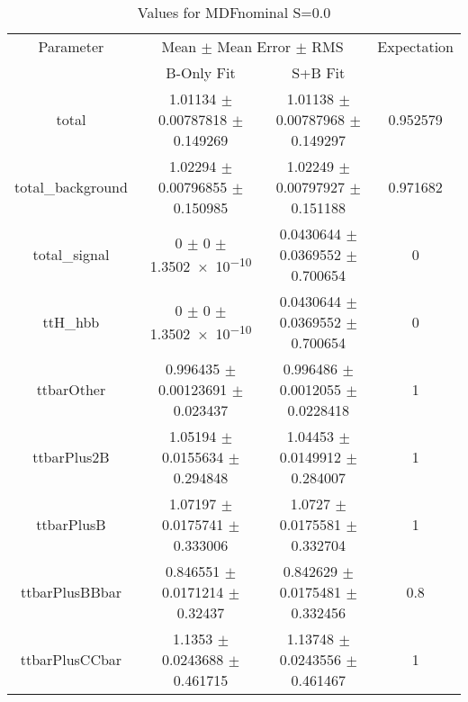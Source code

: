 \begin{table}
\centering
\caption{Values for MDFnominal S=0.0}
\begin{tabular}{cccc}
\toprule
Parameter & \multicolumn{2}{c}{Mean $\pm$ Mean Error $\pm$ RMS} & Expectation\\
 & B-Only Fit & S+B Fit & \\
\midrule
total & \num{1.01134} $\pm$ \num{0.00787818} $\pm$ \num{0.149269} & \num{1.01138} $\pm$ \num{0.00787968} $\pm$ \num{0.149297} & \num{0.952579}\\
total\_background & \num{1.02294} $\pm$ \num{0.00796855} $\pm$ \num{0.150985} & \num{1.02249} $\pm$ \num{0.00797927} $\pm$ \num{0.151188} & \num{0.971682}\\
total\_signal & \num{0} $\pm$ \num{0} $\pm$ \num{1.3502e-10} & \num{0.0430644} $\pm$ \num{0.0369552} $\pm$ \num{0.700654} & \num{0}\\
ttH\_hbb & \num{0} $\pm$ \num{0} $\pm$ \num{1.3502e-10} & \num{0.0430644} $\pm$ \num{0.0369552} $\pm$ \num{0.700654} & \num{0}\\
ttbarOther & \num{0.996435} $\pm$ \num{0.00123691} $\pm$ \num{0.023437} & \num{0.996486} $\pm$ \num{0.0012055} $\pm$ \num{0.0228418} & \num{1}\\
ttbarPlus2B & \num{1.05194} $\pm$ \num{0.0155634} $\pm$ \num{0.294848} & \num{1.04453} $\pm$ \num{0.0149912} $\pm$ \num{0.284007} & \num{1}\\
ttbarPlusB & \num{1.07197} $\pm$ \num{0.0175741} $\pm$ \num{0.333006} & \num{1.0727} $\pm$ \num{0.0175581} $\pm$ \num{0.332704} & \num{1}\\
ttbarPlusBBbar & \num{0.846551} $\pm$ \num{0.0171214} $\pm$ \num{0.32437} & \num{0.842629} $\pm$ \num{0.0175481} $\pm$ \num{0.332456} & \num{0.8}\\
ttbarPlusCCbar & \num{1.1353} $\pm$ \num{0.0243688} $\pm$ \num{0.461715} & \num{1.13748} $\pm$ \num{0.0243556} $\pm$ \num{0.461467} & \num{1}\\
\bottomrule
\end{tabular}
\end{table}